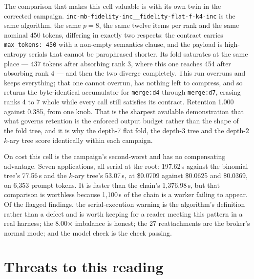 \documentclass[11pt]{article}
\begin{document}
The comparison that makes this cell valuable is with its own twin in the corrected
campaign. \texttt{inc-mb-fidelity-inc\_\_fidelity-flat-f-k4-inc} is the same algorithm, the
same $p=8$, the same twelve items per rank and the same nominal 450 tokens, differing in
exactly two respects: the contract carries \texttt{max\_tokens: 450} with a non-empty
semantics clause, and the payload is high-entropy serials that cannot be paraphrased
shorter. Its fold saturates at the same place --- 437 tokens after absorbing rank 3, where
this one reaches 454 after absorbing rank 4 --- and then the two diverge completely. This
run overruns and keeps everything; that one cannot overrun, has nothing left to compress,
and so returns the byte-identical accumulator for \texttt{merge:d4} through
\texttt{merge:d7}, erasing ranks 4 to 7 whole while every call still satisfies its contract.
Retention 1.000 against 0.385, from one knob. That is the sharpest available demonstration
that what governs retention is the enforced output budget rather than the shape of the fold
tree, and it is why the depth-7 flat fold, the depth-3 tree and the depth-2 $k$-ary tree
score identically within each campaign.

On cost this cell is the campaign's second-worst and has no compensating advantage. Seven
applications, all serial at the root: 197.62\,s against the binomial tree's 77.56\,s and the
$k$-ary tree's 53.07\,s, at \$0.0709 against \$0.0625 and \$0.0369, on 6{,}353 prompt tokens.
It is faster than the chain's 1{,}376.98\,s, but that comparison is worthless because
1{,}100\,s of the chain is a worker failing to appear. Of the flagged findings, the
serial-execution warning is the algorithm's definition rather than a defect and is worth
keeping for a reader meeting this pattern in a real harness; the 8.00$\times$ imbalance is
honest; the 27 reattachments are the broker's normal mode; and the model check is the check
passing.

\section{Threats to this reading}
\end{document}
